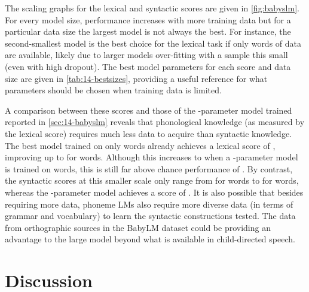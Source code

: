 The scaling graphs for the lexical and syntactic scores are given in \cref{fig:babyslm}. For every model size, performance increases with more training data but for a particular data size the largest model is not always the best. For instance, the second-smallest model is the best choice for the lexical task if only  words of data are available, likely due to larger models over-fitting with a sample this small (even with high dropout). The best model parameters for each score and data size are given in \cref{tab:14-bestsizes}, providing a useful reference for what parameters should be chosen when training data is limited.

A comparison between these scores and those of the -parameter model trained reported in \cref{sec:14-babyslm} reveals that phonological knowledge (as measured by the lexical score) requires much less data to acquire than syntactic knowledge. The best model trained on only  words already achieves a lexical score of , improving up to  for  words. Although this increases to  when a -parameter model is trained on  words, this is still far above chance performance of . By contrast, the syntactic scores at this smaller scale only range from  for  words to  for  words, whereas the -parameter model achieves a score of . It is also possible that besides requiring more data, phoneme LMs also require more diverse data (in terms of grammar and vocabulary) to learn the syntactic constructions tested. The data from orthographic sources in the BabyLM dataset could be providing an advantage to the large model beyond what is available in child-directed speech.

\section{Discussion}\label{sec:14-discussion}

